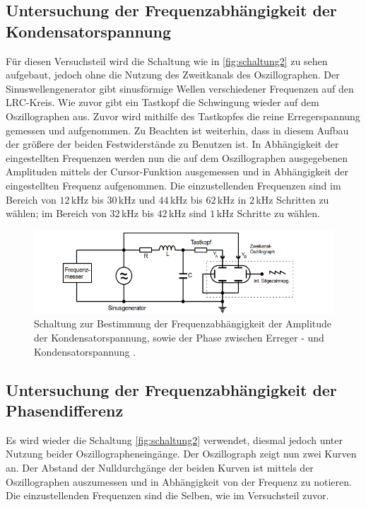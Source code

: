     \subsection{Untersuchung der Frequenzabhängigkeit der Kondensatorspannung}
        Für diesen Versuchsteil wird die Schaltung wie in \autoref{fig:schaltung2} zu sehen aufgebaut, jedoch ohne die Nutzung des Zweitkanals des Oszillographen.
        Der Sinuswellengenerator gibt sinusförmige Wellen verschiedener Frequenzen auf den LRC-Kreis. Wie zuvor gibt ein Tastkopf die Schwingung
        wieder auf dem Oszillographen aus. Zuvor wird mithilfe des Tastkopfes die reine Erregerspannung gemessen und aufgenommen. Zu Beachten 
        ist weiterhin, dass in diesem Aufbau der größere der beiden Festwiderstände zu Benutzen ist. In Abhängigkeit der eingestellten Frequenzen
        werden nun die auf dem Oszillographen ausgegebenen Amplituden mittels der Cursor-Funktion ausgemessen und in Abhängigkeit der eingestellten
        Frequenz aufgenommen. Die einzustellenden Frequenzen sind im Bereich von $12$\,kHz bis $30$\,kHz und $44$\,kHz bis $62$\,kHz in $2$\,kHz Schritten zu wählen;
        im Bereich von $32$\,kHz bis $42$\,kHz sind $1$\,kHz Schritte zu wählen.
        \begin{figure}
            \centering
            \includegraphics[width=\textwidth]{content/s2.png}
            \caption{Schaltung zur Bestimmung der Frequenzabhängigkeit der Amplitude der Kondensatorspannung, sowie der Phase zwischen Erreger - und Kondensatorspannung \cite[296]{V354}.}
            \label{fig:schaltung2}
        \end{figure} 
    \subsection{Untersuchung der Frequenzabhängigkeit der Phasendifferenz}
        Es wird wieder die Schaltung \autoref{fig:schaltung2} verwendet, diesmal jedoch unter Nutzung beider Oszillographeneingänge. Der Oszillograph
        zeigt nun zwei Kurven an. Der Abstand der Nulldurchgänge der beiden Kurven ist mittels der Oszillographen auszumessen und in 
        Abhängigkeit von der Frequenz zu notieren. Die einzustellenden Frequenzen sind die Selben, wie im Versuchsteil zuvor.    